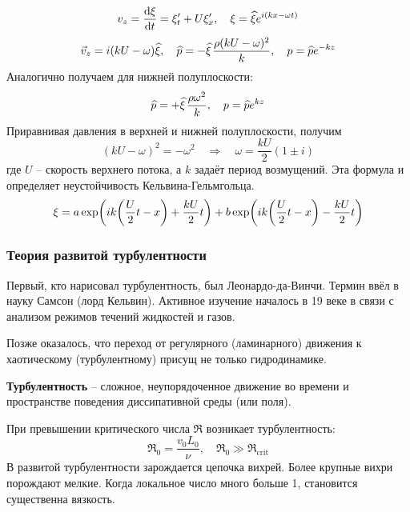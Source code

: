 \begin{equation}
    v_z = \dv{\xi}{t} = \xi'_t + U \xi'_x, \quad
    \xi = \widehat{\xi} e^{i(kx-\omega t)}
\end{equation}
\begin{equation}
    \vec{v}_z = i(kU-\omega)\hat{\xi}, \quad
    \hat{p} = -\phat{\xi} \frac{\rho(kU-\omega)^2}{k}, \quad
        p = \hat{p} e^{-kz}
\end{equation}
Аналогично получаем для нижней полуплоскости:
\begin{equation}
   \hat{p} = +\phat{\xi} \frac{\rho \omega^2}{k}, \quad
   p = \hat{p} e^{kz} 
\end{equation}
Приравнивая давления в верхней и нижней полуплоскости, получим
\begin{equation}
    (kU-\omega)^2 = -\omega^2 
    \quad\Rightarrow\quad 
    \omega = \frac{kU}{2}(1\pm i)
\end{equation}
где $U$ -- скорость верхнего потока, а $k$ задаёт период возмущений.
Эта формула и определяет неустойчивость Кельвина-Гельмгольца.
\begin{equation}
    \xi = a \exp(
        ik \qty(\frac{U}{2}t-x)+ \frac{kU}{2}t
    )+b\exp(
        ik\qty(\frac{U}{2}t-x)-\frac{kU}{2}t
    )
\end{equation}

\subsubsection{Теория развитой турбулентности}
Первый, кто нарисовал турбулентность, был Леонардо-да-Винчи. Термин
ввёл в науку Самсон (лорд Кельвин). Активное изучение началось в 
19 веке в связи с анализом режимов течений жидкостей и газов.

Позже оказалось, что переход от регулярного (ламинарного) движения
к хаотическому (турбулентному) присущ не только гидродинамике.

\textbf{Турбулентность} -- сложное, неупорядоченное движение 
во времени и пространстве поведения диссипативной среды (или поля).

При превышении критического числа $\Re$ возникает турбулентность:
\begin{equation}
    \Re_0 = \frac{v_0 L_0}{\nu}, \quad \Re_0 \gg \Re_\text{crit}
\end{equation}
В развитой турбулентности зарождается цепочка вихрей. Более крупные
вихри порождают мелкие. Когда локальное число много больше 1, 
становится существенна вязкость.

